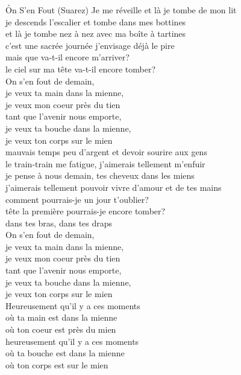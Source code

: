 \documentclass{novel}
\begin{document}
\newpage
\small
\h*{On S'en Fout (Suarez)}
Je me réveille et là je tombe de mon lit \\
je descends l'escalier et tombe dans mes bottines \\
et là je tombe nez à nez avec ma boîte à tartines \\
c'est une sacrée journée j'envisage déjà le pire \\
mais que va-t-il encore m'arriver? \\
le ciel sur ma tête va-t-il encore tomber? \\

On s'en fout de demain, \\
je veux ta main dans la mienne, \\
je veux mon coeur près du tien \\
tant que l'avenir nous emporte, \\
je veux ta bouche dans la mienne, \\
je veux ton corps sur le mien \\

mauvais temps peu d'argent et devoir sourire aux gens \\
le train-train me fatigue, j'aimerais tellement m'enfuir \\
je pense à nous demain, tes cheveux dans les miens \\
j'aimerais tellement pouvoir vivre d'amour et de tes mains \\
comment pourrais-je un jour t'oublier? \\
tête la première pourrais-je encore tomber? \\
dans tes bras, dans tes draps \\

On s'en fout de demain, \\
je veux ta main dans la mienne, \\
je veux mon coeur près du tien \\
tant que l'avenir nous emporte, \\
je veux ta bouche dans la mienne, \\
je veux ton corps sur le mien \\

Heureusement qu'il y a ces moments \\
où ta main est dans la mienne \\
où ton coeur est près du mien \\
heureusement qu'il y a ces moments \\
où ta bouche est dans la mienne \\
où ton corps est sur le mien \\
\end{document}
